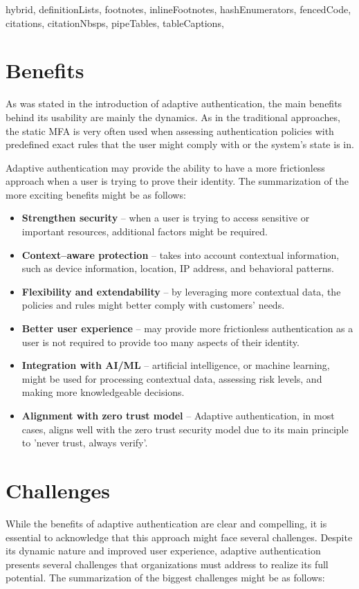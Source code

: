 \documentclass[
  digital,     %
  oneside,     %
  nosansbold,  %
  nocolorbold, %
  lof,         %
  lot,         %
]{fithesis4}
\begin{document}
\begin{markdown*}{%
  hybrid,
  definitionLists,
  footnotes,
  inlineFootnotes,
  hashEnumerators,
  fencedCode,
  citations,
  citationNbsps,
  pipeTables,
  tableCaptions,
}
\section{Benefits}
As was stated in the introduction of adaptive authentication, the main benefits behind its usability are mainly the dynamics.
As in the traditional approaches, the static MFA is very often used when assessing authentication policies with predefined exact rules that the user might comply with or the system's state is in. 

Adaptive authentication may provide the ability to have a more frictionless approach when a user is trying to prove their identity.
\cite{intro-silverfort}\cite{intro-descope}
\newline
\newline
The summarization of the more exciting benefits might be as follows:

\begin{itemize}
    \item \textbf{Strengthen security} -- when a user is trying to access sensitive or important resources, additional factors might be required.
    \item \textbf{Context--aware protection} -- takes into account contextual information, such as device information, location, IP address, and behavioral patterns.
    \item \textbf{Flexibility and extendability} -- by leveraging more contextual data, the policies and rules might better comply with customers' needs.
    \item \textbf{Better user experience} -- may provide more frictionless authentication as a user is not required to provide too many aspects of their identity.
    \item \textbf{Integration with AI/ML} -- artificial intelligence, or machine learning, might be used for processing contextual data, assessing risk levels, and making more knowledgeable decisions.
    \item \textbf{Alignment with zero trust model} -- Adaptive authentication, in most cases, aligns well with the zero trust security model due to its main principle to 'never trust, always verify'. \cite{intro-incognia}
\end{itemize}

\newpage
\section{Challenges}
While the benefits of adaptive authentication are clear and compelling, it is essential to acknowledge that this approach might face several challenges.
Despite its dynamic nature and improved user experience, adaptive authentication presents several challenges that organizations must address to realize its full potential.
\newline
\newline
The summarization of the biggest challenges might be as follows:


\end{markdown*}
\end{document}

